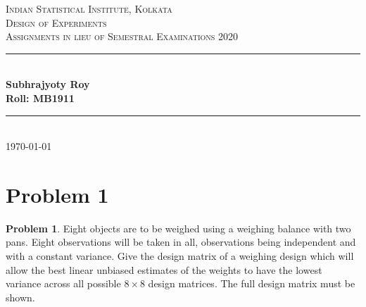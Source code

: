 \documentclass[12pt]{article}
\newcommand{\HRule}{\rule{\linewidth}{0.5mm}} %
\theoremstyle{definition}
\newtheorem*{prb}{Problem}
\newenvironment{problem}{
\begin{tcolorbox}[colback=blue!5!white,colframe=blue!75!black, parbox = true] \begin{prb}  }{\end{prb}\end{tcolorbox} }
\begin{document}
\begin{titlepage}
    
\centering
\textsc{\LARGE Indian Statistical Institute, Kolkata}\\[1.5cm] %
\textsc{\Large Design of Experiments}\\[0.5cm] %
\textsc{\large Assignments in lieu of Semestral Examinations 2020}\\[0.5cm] %

\HRule \\[0.4cm]
\large \textbf{Subhrajyoty Roy}\\
\large \textbf{Roll:  MB1911}\\
\HRule \\[1.5cm]
\normalsize \today

\end{titlepage}


\tableofcontents
\clearpage



\section{Problem 1}

\begin{problem}
    Eight objects are to be weighed using a weighing balance with two pans. Eight observations will be taken in all, observations being independent and with a constant variance. Give the design matrix of a weighing design which will allow the best linear unbiased estimates of the weights to have the lowest variance across all possible $8 \times 8$ design matrices. The full design matrix must be shown.
\end{problem}
\end{document}
